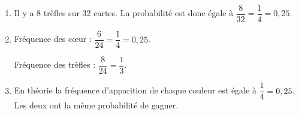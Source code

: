 
\medskip

% 
%

\begin{enumerate}
\item %
Il y a 8 trèfles sur 32 cartes. La probabilité est donc égale à $\dfrac{8}{32} = \dfrac{1}{4} = 0,25$.
\item %

% 
Fréquence des cœur : $\dfrac{6}{24} = \dfrac{1}{4} = 0,25$.

Fréquence des trèfles : $\dfrac{8}{24} = \dfrac{1}{3}$.
\item %


En théorie la fréquence d’apparition de chaque couleur est égale à $\dfrac{1}{4} = 0,25$. Les deux ont la même probabilité de gagner.
\end{enumerate}
 
\bigskip

